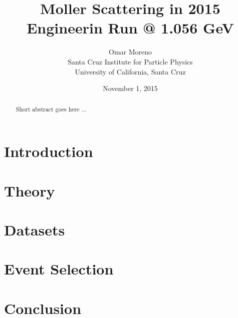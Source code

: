 \documentclass[twoside]{article}
\title{Moller Scattering in 2015 Engineerin Run @ 1.056 GeV}
\date{November 1, 2015}
\author{Omar Moreno \\
        Santa Cruz Institute for Particle Physics \\
        University of California, Santa Cruz
}
\begin{document}
    \maketitle

    \begin{abstract}
        Short abstract goes here ...
    \end{abstract}

    \section*{Introduction}

    \section*{Theory}

    \section*{Datasets}

    \section*{Event Selection}

    \section*{Conclusion}
\end{document}
